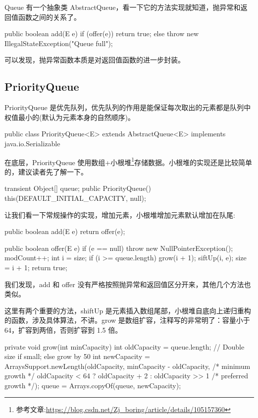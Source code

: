 Queue 有一个抽象类 AbstractQueue，看一下它的方法实现就知道，抛异常和返回值函数之间的关系了。

\begin{Java}
public boolean add(E e) {
    if (offer(e))
        return true;
    else
        throw new IllegalStateException("Queue full");
}
\end{Java}

可以发现，抛异常函数本质是对返回值函数的进一步封装。

\subsection{PriorityQueue}

PriorityQueue 是优先队列，优先队列的作用是能保证每次取出的元素都是队列中权值最小的(默认为元素本身的自然顺序)。

\begin{Java}
public class PriorityQueue<E> extends AbstractQueue<E> implements java.io.Serializable
\end{Java}

在底层，PriorityQueue 使用数组+小根堆\footnote{参考文章:\url{https://blog.csdn.net/Zj_boring/article/details/105157360}}存储数据。小根堆的实现还是比较简单的，建议读者先了解一下。

\begin{Java}
transient Object[] queue;
public PriorityQueue() {
    this(DEFAULT_INITIAL_CAPACITY, null);
}
\end{Java}

让我们看一下常规操作的实现，增加元素，小根堆增加元素默认增加在队尾:

\begin{Java}
public boolean add(E e) {
    return offer(e);
}

public boolean offer(E e) {
    if (e == null)
        throw new NullPointerException();
    modCount++;
    int i = size;
    if (i >= queue.length)
        grow(i + 1);
    siftUp(i, e);
    size = i + 1;
    return true;
}
\end{Java}

我们发现，add 和 offer 没有严格按照抛异常和返回值区分开来，其他几个方法也类似。

这里有两个重要的方法，shiftUp 是元素插入数组尾部，小根堆自底向上递归重构的函数，涉及具体算法，不讲。grow 是数组扩容，注释写的非常明了：容量小于 64，扩容到两倍，否则扩容到 1.5 倍。

\begin{Java}
private void grow(int minCapacity) {
    int oldCapacity = queue.length;
    // Double size if small; else grow by 50%
    int newCapacity = ArraysSupport.newLength(oldCapacity,
            minCapacity - oldCapacity, /* minimum growth */
            oldCapacity < 64 ? oldCapacity + 2 : oldCapacity >> 1
                                       /* preferred growth */);
    queue = Arrays.copyOf(queue, newCapacity);
}
\end{Java}

